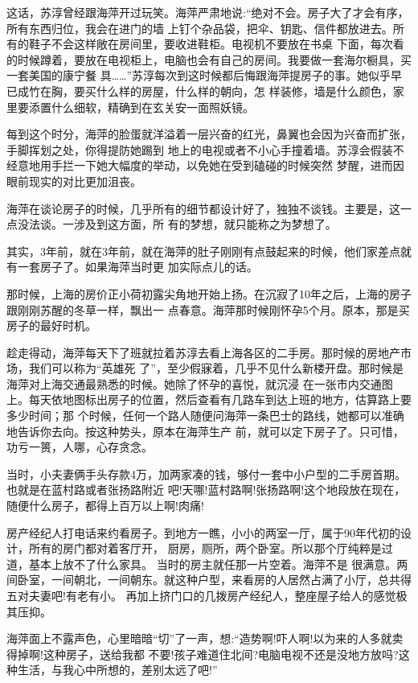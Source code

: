 \documentclass[11pt,a4paper,onecolumn]{article}
\begin{document}
这话，苏淳曾经跟海萍开过玩笑。海萍严肃地说:``绝对不会。房子大了才会有序，所有东西归位，我会在进门的墙
上钉个杂品袋，把伞、钥匙、信件都放进去。所有的鞋子不会这样敞在房间里，要收进鞋柜。电视机不要放在书桌
下面，每次看的时候蹲着，要放在电视柜上，电脑也会有自己的房间。我要做一套海尔橱具，买一套美国的康宁餐
具……''苏淳每次到这时候都后悔跟海萍提房子的事。她似乎早已成竹在胸，要买什么样的房屋，什么样的朝向，怎
样装修，墙是什么颜色，家里要添置什么细软，精确到在玄关安一面照妖镜。

每到这个时分，海萍的脸蛋就洋溢着一层兴奋的红光，鼻翼也会因为兴奋而扩张，手脚挥划之处，你得提防她踢到
地上的电视或者不小心手撞着墙。苏淳会假装不经意地用手拦一下她大幅度的举动，以免她在受到磕碰的时候突然
梦醒，进而因眼前现实的对比更加沮丧。

海萍在谈论房子的时候，几乎所有的细节都设计好了，独独不谈钱。主要是，这一点没法谈。一涉及到这方面，所
有的梦想，就只能称之为梦想了。

其实，3年前，就在3年前，就在海萍的肚子刚刚有点鼓起来的时候，他们家差点就有一套房子了。如果海萍当时更
加实际点儿的话。

那时候，上海的房价正小荷初露尖角地开始上扬。在沉寂了10年之后，上海的房子跟刚刚苏醒的冬草一样，飘出一
点春意。海萍那时候刚怀孕5个月。原本，那是买房子的最好时机。

趁走得动，海萍每天下了班就拉着苏淳去看上海各区的二手房。那时候的房地产市场，我们可以称为``英雄死
了''，至少假寐着，几乎不见什么新楼开盘。那时候是海萍对上海交通最熟悉的时候。她除了怀孕的喜悦，就沉浸
在一张市内交通图上。每天依地图标出房子的位置，然后查看有几路车到达上班的地方，估算路上要多少时间；那
个时候，任何一个路人随便问海萍一条巴士的路线，她都可以准确地告诉你去向。按这种势头，原本在海萍生产
前，就可以定下房子了。只可惜，功亏一篑，人哪，心存贪念。

当时，小夫妻俩手头存款4万，加两家凑的钱，够付一套中小户型的二手房首期。也就是在蓝村路或者张扬路附近
吧!天哪!蓝村路啊!张扬路啊!这个地段放在现在，随便什么房子，都得上百万以上啊!肉痛!

房产经纪人打电话来约看房子。到地方一瞧，小小的两室一厅，属于90年代初的设计，所有的房门都对着客厅开，
厨房，厕所，两个卧室。所以那个厅纯粹是过道，基本上放不了什么家具。 当时的房主就任那一片空着。海萍不是
很满意。两间卧室，一间朝北，一间朝东。就这种户型，来看房的人居然占满了小厅，总共得五对夫妻吧!有老有小。
再加上挤门口的几拨房产经纪人，整座屋子给人的感觉极其压抑。

海萍面上不露声色，心里暗暗``切''了一声，想:``造势啊!吓人啊!以为来的人多就卖得掉啊!这种房子，送给我都
不要!孩子难道住北间?电脑电视不还是没地方放吗?这种生活，与我心中所想的，差别太远了吧!''
\end{document}
